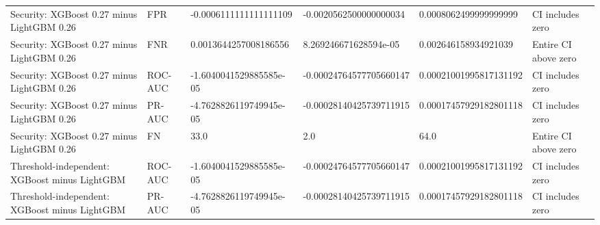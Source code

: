 \begin{table}[htbp]
\begin{tabular}{llllll}
Security: XGBoost 0.27 minus LightGBM 0.26 & FPR & -0.0006111111111111109 & -0.0020562500000000034 & 0.0008062499999999999 & CI includes zero \\
Security: XGBoost 0.27 minus LightGBM 0.26 & FNR & 0.0013644257008186556 & 8.269246671628594e-05 & 0.002646158934921039 & Entire CI above zero \\
Security: XGBoost 0.27 minus LightGBM 0.26 & ROC-AUC & -1.6040041529885585e-05 & -0.00024764577705660147 & 0.00021001995817131192 & CI includes zero \\
Security: XGBoost 0.27 minus LightGBM 0.26 & PR-AUC & -4.7628826119749945e-05 & -0.00028140425739711915 & 0.00017457929182801118 & CI includes zero \\
Security: XGBoost 0.27 minus LightGBM 0.26 & FN & 33.0 & 2.0 & 64.0 & Entire CI above zero \\
Threshold-independent: XGBoost minus LightGBM & ROC-AUC & -1.6040041529885585e-05 & -0.00024764577705660147 & 0.00021001995817131192 & CI includes zero \\
Threshold-independent: XGBoost minus LightGBM & PR-AUC & -4.7628826119749945e-05 & -0.00028140425739711915 & 0.00017457929182801118 & CI includes zero \\
\hline
\end{tabular}
\end{table}
